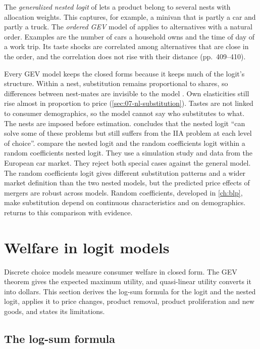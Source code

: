 The \emph{generalized nested logit} of \citet{WenKoppelman2001} lets a product belong to several nests with
allocation weights. This captures, for example, a minivan that is partly a car and partly a truck. The
\emph{ordered GEV} model of \citet[p.~409]{Small1987} applies to alternatives with a natural order.
Examples are the number of cars a household owns and the time of day of a work trip. Its taste shocks are correlated among alternatives
that are close in the order, and the correlation does not rise with their distance (pp.~409--410).

Every GEV model keeps the closed forms because it keeps much of the logit's structure. Within a nest, substitution
remains proportional to shares, so differences between nest-mates are invisible to the model
\citep[p.~524]{Nevo2000a}. Own elasticities still rise almost in proportion to price
(\cref{sec:07-nl-substitution}). Tastes are not linked to consumer demographics, so the model cannot say who
substitutes to what. The nests are imposed before estimation. \citet[p.~230]{Hausman1997} concludes that the nested
logit ``can solve some of these problems but still suffers from the IIA problem at each level of choice''.
\citet[p.~916]{GrigolonVerboven2014} compare the nested logit and the random coefficients logit within a random
coefficients nested logit. They use a simulation study and data from the European car market. They reject both
special cases against the general model. The random coefficients logit gives different substitution patterns and a
wider market definition than the two nested models, but the predicted price effects of mergers are robust across
models.
Random coefficients, developed in \cref{ch:blp}, make substitution depend on continuous characteristics and on
demographics.  returns to this comparison with evidence.

\section{Welfare in logit models}\label{sec:07-welfare}

Discrete choice models measure consumer welfare in closed form. The GEV theorem gives the expected maximum utility,
and quasi-linear utility converts it into dollars. This section derives the log-sum formula for the logit and the
nested logit, applies it to price changes, product removal, product proliferation and new goods, and states its
limitations.

\subsection{The log-sum formula}\label{sec:07-logsum}

